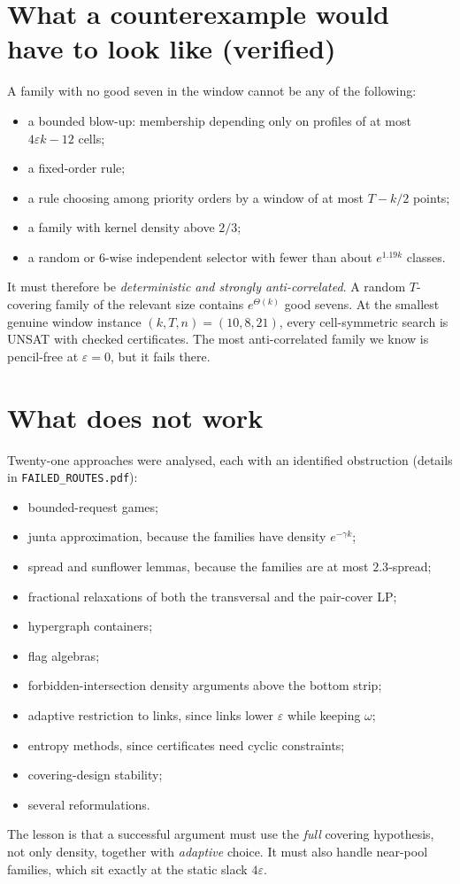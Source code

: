 \documentclass[11pt]{article}
\begin{document}
\section{What a counterexample would have to look like (verified)}
A family with no good seven in the window cannot be any of the following:
\begin{itemize}
\item a bounded blow-up: membership depending only on profiles of at most $4\varepsilon k-12$ cells;
\item a fixed-order rule;
\item a rule choosing among priority orders by a window of at most $T-k/2$ points;
\item a family with kernel density above $2/3$;
\item a random or 6-wise independent selector with fewer than about $e^{1.19k}$ classes.
\end{itemize}
It must therefore be \emph{deterministic and strongly anti-correlated}. A random $T$-covering family of the relevant
size contains $e^{\Theta(k)}$ good sevens. At the smallest genuine window instance $(k,T,n)=(10,8,21)$, every
cell-symmetric search is UNSAT with checked certificates. The most anti-correlated family we know is pencil-free at
$\varepsilon=0$, but it fails there.

\section{What does not work}
Twenty-one approaches were analysed, each with an identified obstruction (details in \texttt{FAILED\_ROUTES.pdf}):
\begin{itemize}
\item bounded-request games;
\item junta approximation, because the families have density $e^{-\gamma k}$;
\item spread and sunflower lemmas, because the families are at most $2.3$-spread;
\item fractional relaxations of both the transversal and the pair-cover LP;
\item hypergraph containers;
\item flag algebras;
\item forbidden-intersection density arguments above the bottom strip;
\item adaptive restriction to links, since links lower $\varepsilon$ while keeping $\omega$;
\item entropy methods, since certificates need cyclic constraints;
\item covering-design stability;
\item several reformulations.
\end{itemize}
The lesson is that a successful argument must use the \emph{full} covering hypothesis, not only density, together with
\emph{adaptive} choice. It must also handle near-pool families, which sit exactly at the static slack $4\varepsilon$.
\end{document}
